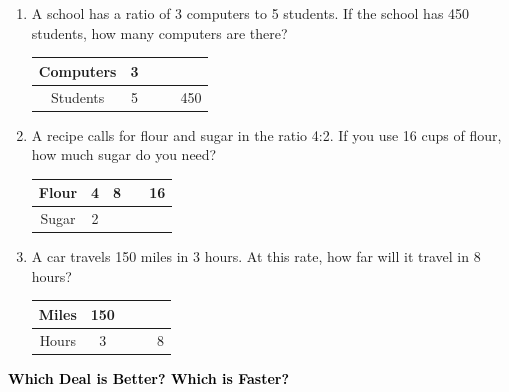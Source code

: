 \documentclass[12pt, letterpaper, fleqn]{article}
\begin{document}
\begin{enumerate}[itemsep=2.3cm, leftmargin=0.6cm]

\item A school has a ratio of 3 computers to 5 students. If the school has 450 students, how many computers are there?

\begin{center}
\begin{tabular}{|c|c|c|c|c|}
\hline
Computers & 3 & & & \\
\hline
Students & 5 & & & 450 \\
\hline
\end{tabular}
\end{center}

\vspace{1.5cm}

\item A recipe calls for flour and sugar in the ratio 4:2. If you use 16 cups of flour, how much sugar do you need?

\begin{center}
\begin{tabular}{|c|c|c|c|c|}
\hline
Flour & 4 & 8 & & 16 \\
\hline
Sugar & 2 & & & \\
\hline
\end{tabular}
\end{center}

\vspace{1.5cm}

\item A car travels 150 miles in 3 hours. At this rate, how far will it travel in 8 hours?

\begin{center}
\begin{tabular}{|c|c|c|c|c|}
\hline
Miles & 150 & & & \\
\hline
Hours & 3 & & & 8 \\
\hline
\end{tabular}
\end{center}

\vspace{1.5cm}

\end{enumerate}

\newpage

\begin{tcolorbox}[colback=customteal!20]
\large\textcolor{black}{\textbf{Which Deal is Better? Which is Faster?}}
\end{tcolorbox}
\end{document}

